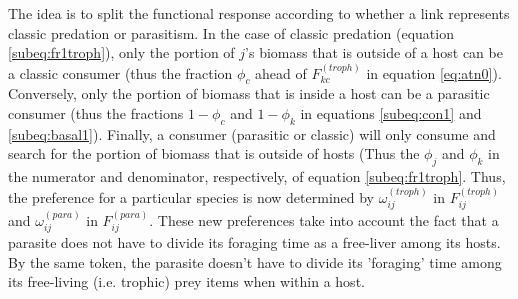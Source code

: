 \documentclass[11pt]{amsart}
\begin{document}
The idea is to split the functional response according to whether a link represents classic predation or parasitism.  In the case of classic predation (equation \eqref{subeq:fr1troph}), only the portion of $j$'s biomass that is outside of a host can be a classic consumer (thus the fraction $\phi_c$ ahead of $F_{kc}^{(troph)}$ in equation \eqref{eq:atn0}).  Conversely, only the portion of biomass that is inside a host can be a parasitic consumer (thus the fractions $1-\phi_c$ and $1-\phi_k$ in equations \eqref{subeq:con1} and \eqref{subeq:basal1}).  Finally, a consumer (parasitic or classic) will only consume and search for the portion of biomass that is outside of hosts (Thus the $\phi_j$ and $\phi_k$ in the numerator and denominator, respectively, of equation \eqref{subeq:fr1troph}.  Thus, the preference for a particular species is now determined by $\omega_{ij}^{(troph)}$ in $F_{ij}^{(troph)}$ and $\omega_{ij}^{(para)}$ in $F_{ij}^{(para)}$.  These new preferences take into account the fact that a parasite does not have to divide its foraging time as a free-liver among its hosts.  By the same token, the parasite doesn't have to divide its 'foraging' time among its free-living (i.e. trophic) prey items when within a host.
\end{document}
